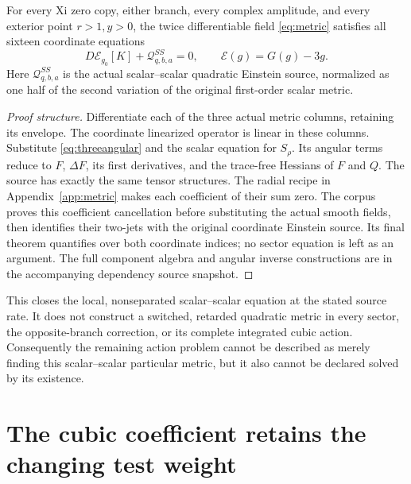 \begin{theorem}\label{thm:metric}
For every Xi zero copy, either branch, every complex amplitude, and every exterior point \(r>1,y>0\), the twice differentiable field \eqref{eq:metric} satisfies all sixteen coordinate equations
\[
 D\mathcal E_{g_0}[K]+\mathcal Q^{SS}_{q,b,a}=0,
 \qquad \mathcal E(g)=G(g)-3g.
\]
Here \(\mathcal Q^{SS}_{q,b,a}\) is the actual scalar--scalar quadratic Einstein source, normalized as one half of the second variation of the original first-order scalar metric.
\end{theorem}
\begin{proof}[Proof structure]
Differentiate each of the three actual metric columns, retaining its envelope. The coordinate linearized operator is linear in these columns. Substitute \eqref{eq:threeangular} and the scalar equation for \(S_\rho\). Its angular terms reduce to \(F\), \(\Delta F\), its first derivatives, and the trace-free Hessians of \(F\) and \(Q\). The source has exactly the same tensor structures. The radial recipe in Appendix~\ref{app:metric} makes each coefficient of their sum zero. The corpus proves this coefficient cancellation before substituting the actual smooth fields, then identifies their two-jets with the original coordinate Einstein source. Its final theorem quantifies over both coordinate indices; no sector equation is left as an argument. The full component algebra and angular inverse constructions are in the accompanying dependency source snapshot.
\end{proof}

This closes the local, nonseparated scalar--scalar equation at the stated source rate. It does not construct a switched, retarded quadratic metric in every sector, the opposite-branch correction, or its complete integrated cubic action. Consequently the remaining action problem cannot be described as merely finding this scalar--scalar particular metric, but it also cannot be declared solved by its existence.

\section{The cubic coefficient retains the changing test weight}


